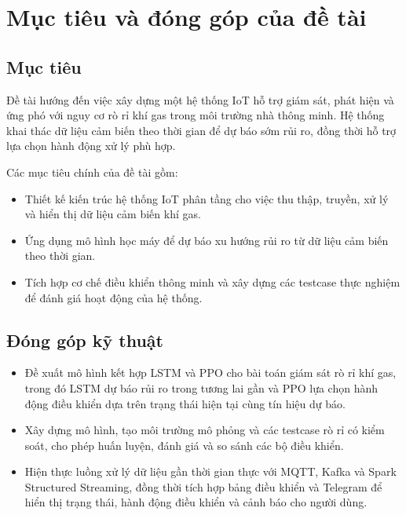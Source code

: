 \section{Mục tiêu và đóng góp của đề tài}

\subsection{Mục tiêu}

Đề tài hướng đến việc xây dựng một hệ thống IoT hỗ trợ giám sát, phát hiện và ứng phó với nguy cơ rò rỉ khí gas trong môi trường nhà thông minh. Hệ thống khai thác dữ liệu cảm biến theo thời gian để dự báo sớm rủi ro, đồng thời hỗ trợ lựa chọn hành động xử lý phù hợp.

Các mục tiêu chính của đề tài gồm:

\begin{itemize}[label=\textendash]
  \item Thiết kế kiến trúc hệ thống IoT phân tầng cho việc thu thập, truyền, xử lý và hiển thị dữ liệu cảm biến khí gas.

  \item Ứng dụng mô hình học máy để dự báo xu hướng rủi ro từ dữ liệu cảm biến theo thời gian.

  \item Tích hợp cơ chế điều khiển thông minh và xây dựng các testcase thực nghiệm để đánh giá hoạt động của hệ thống.
\end{itemize}

\subsection{Đóng góp kỹ thuật}

\begin{itemize}[label=\textendash]
\item Đề xuất mô hình kết hợp LSTM và PPO cho bài toán giám sát rò rỉ khí gas, trong đó LSTM dự báo rủi ro trong tương lai gần và PPO lựa chọn hành động điều khiển dựa trên trạng thái hiện tại cùng tín hiệu dự báo.

\item Xây dựng mô hình, tạo môi trường mô phỏng và các testcase rò rỉ có kiểm soát, cho phép huấn luyện, đánh giá và so sánh các bộ điều khiển.

\item Hiện thực luồng xử lý dữ liệu gần thời gian thực với MQTT, Kafka và Spark Structured Streaming, đồng thời tích hợp bảng điều khiển và Telegram để hiển thị trạng thái, hành động điều khiển và cảnh báo cho người dùng.
\end{itemize}



